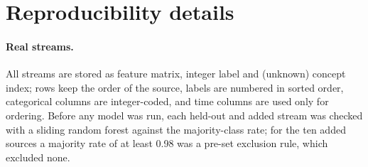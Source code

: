 \section{Reproducibility details}
\label{app:repro}

\paragraph{Real streams.} All streams are stored as feature matrix, integer label and (unknown) concept index; rows keep
the order of the source, labels are numbered in sorted order, categorical columns are integer-coded, and time columns
are used only for ordering. Before any model was run, each held-out and added stream was checked with a sliding random
forest against the majority-class rate; for the ten added sources a majority rate of at least 0.98 was a pre-set
exclusion rule, which excluded none.
